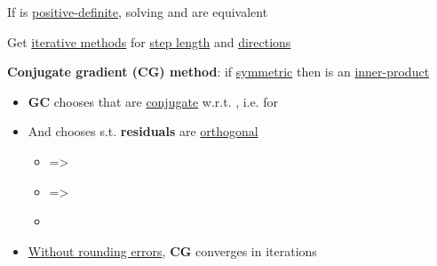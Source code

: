 If  is \underline{positive-definite}, solving  and
are equivalent


Get \underline{iterative methods}
for \underline{step length}  and \underline{directions} 

\hSep %

\textbf{Conjugate gradient (CG) method}: if  \underline{symmetric} then
is an \underline{inner-product}
\begin{itemize}

      \item
            \textbf{GC} chooses  that are \underline{conjugate}
            w.r.t. ,
            i.e. 
            for 
      \item
            And chooses  s.t. \textbf{residuals}
            are \underline{orthogonal}

            \begin{itemize}

                  \item
                         =>
                  \item
                         =>
                  \item
            \end{itemize}
      \item
            \underline{Without rounding errors}, \textbf{CG} converges in  iterations


\end{itemize}
